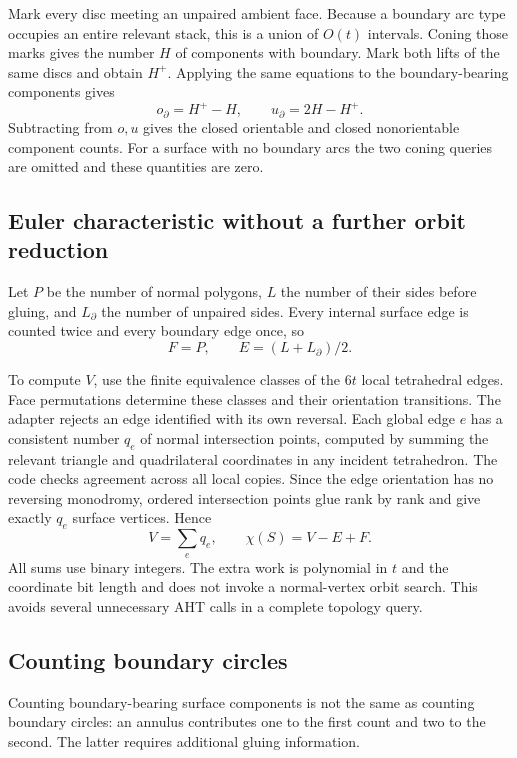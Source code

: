 \documentclass[11pt,a4paper]{article}
\theoremstyle{definition}\newtheorem{definition}[theorem]{Definition}
\theoremstyle{remark}\newtheorem{remark}[theorem]{Remark}
\begin{document}
Mark every disc meeting an unpaired ambient face. Because a boundary arc
type occupies an entire relevant stack, this is a union of $O(t)$ intervals.
Coning those marks gives the number $H$ of components with boundary. Mark
both lifts of the same discs and obtain $H^+$. Applying the same equations
to the boundary-bearing components gives
\[
 o_\partial=H^+-H,\qquad u_\partial=2H-H^+.
\]
Subtracting from $o,u$ gives the closed orientable and closed nonorientable
component counts. For a surface with no boundary arcs the two coning
queries are omitted and these quantities are zero.

\subsection{Euler characteristic without a further orbit reduction}

Let $P$ be the number of normal polygons, $L$ the number of their sides
before gluing, and $L_\partial$ the number of unpaired sides. Every internal
surface edge is counted twice and every boundary edge once, so
\[
 F=P,\qquad E=(L+L_\partial)/2.
\]

To compute $V$, use the finite equivalence classes of the $6t$ local
tetrahedral edges. Face permutations determine these classes and their
orientation transitions. The adapter rejects an edge identified with its
own reversal. Each global edge $e$ has a consistent number $q_e$ of normal
intersection points, computed by summing the relevant triangle and
quadrilateral coordinates in any incident tetrahedron. The code checks
agreement across all local copies. Since the edge orientation has no
reversing monodromy, ordered intersection points glue rank by rank and
give exactly $q_e$ surface vertices. Hence
\begin{equation}\label{eq:euler}
 V=\sum_e q_e,\qquad \chi(S)=V-E+F.
\end{equation}
All sums use binary integers. The extra work is polynomial in $t$ and the
coordinate bit length and does not invoke a normal-vertex orbit search.
This avoids several unnecessary AHT calls in a complete topology query.

\subsection{Counting boundary circles}

Counting boundary-bearing surface components is not the same as counting
boundary circles: an annulus contributes one to the first count and two
to the second. The latter requires additional gluing information.
\end{document}
